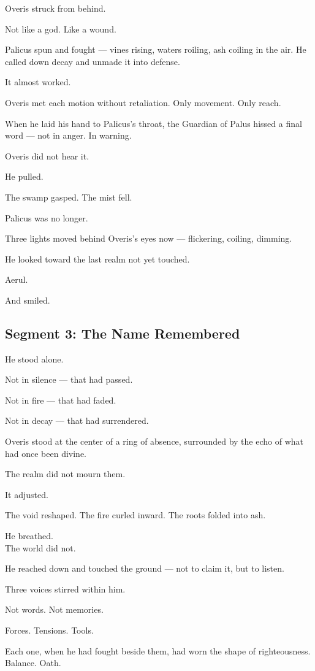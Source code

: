 \documentclass[9pt]{article}
\begin{document}
Overis struck from behind.

Not like a god. Like a wound.

Palicus spun and fought — vines rising, waters roiling, ash coiling in the air. He called down decay and unmade it into defense.

It almost worked.

Overis met each motion without retaliation. Only movement. Only reach.

When he laid his hand to Palicus’s throat, the Guardian of Palus hissed a final word — not in anger. In warning.

Overis did not hear it.

He pulled.

The swamp gasped. The mist fell.

Palicus was no longer.

Three lights moved behind Overis’s eyes now — flickering, coiling, dimming.

He looked toward the last realm not yet touched.

Aerul.

And smiled.

\newpage

\subsection*{Segment 3: The Name Remembered}

He stood alone.

Not in silence — that had passed.

Not in fire — that had faded.

Not in decay — that had surrendered.

Overis stood at the center of a ring of absence, surrounded by the echo of what had once been divine.

The realm did not mourn them.

It adjusted.

The void reshaped. The fire curled inward. The roots folded into ash.

He breathed.\\
The world did not.

He reached down and touched the ground — not to claim it, but to listen.

Three voices stirred within him.

Not words. Not memories.

Forces. Tensions. Tools.

Each one, when he had fought beside them, had worn the shape of righteousness. Balance. Oath.
\end{document}
